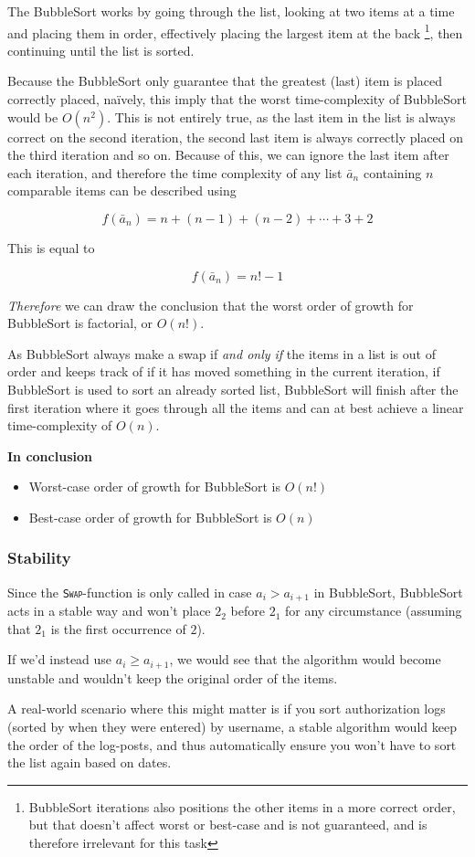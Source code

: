 \documentclass[a4paper,11pt]{article}
\begin{document}
The BubbleSort works by going through the list, looking at two items at a time and placing them in order, effectively placing the largest item at the back \footnote{BubbleSort iterations also positions the other items in a more correct order, but that doesn't affect worst or best-case and is not guaranteed, and is therefore irrelevant for this task}, then continuing until the list is sorted.

Because the BubbleSort only guarantee that the greatest (last) item is placed correctly placed, naïvely, this imply that the worst time-complexity of BubbleSort would be $O(n^2)$. This is not entirely true, as the last item in the list is always correct on the second iteration, the second last item is always correctly placed on the third iteration and so on. Because of this, we can ignore the last item after each iteration, and therefore the time complexity of any list $\bar{a}_n$ containing $n$ comparable items can be described using

$$ f(\bar{a}_n) = n + (n-1) + (n-2) + \cdots + 3 + 2$$

This is equal to

$$ f(\bar{a}_n) = n! - 1$$

\textit{Therefore} we can draw the conclusion that the worst order of growth for BubbleSort is factorial, or $O(n!)$.

As BubbleSort always make a swap if \textit{and only if} the items in a list is out of order and keeps track of if it has moved something in the current iteration, if BubbleSort is used to sort an already sorted list, BubbleSort will finish after the first iteration where it goes through all the items and can at best achieve a linear time-complexity of $O(n)$.

\textbf{In conclusion}

\begin{itemize}
\item Worst-case order of growth for BubbleSort is $O(n!)$
\item Best-case order of growth for BubbleSort is $O(n)$
\end{itemize}

\subsubsection{Stability}
Since the \texttt{\textsc{Swap}}-function is only called in case $a_i > a_{i+1}$ in BubbleSort, BubbleSort acts in a stable way and won't place $2_2$ before $2_1$ for any circumstance (assuming that $2_1$ is the first occurrence of $2$).

If we'd instead use $a_i \geq a_{i+1}$, we would see that the algorithm would become unstable and wouldn't keep the original order of the items.

A real-world scenario where this might matter is if you sort authorization logs (sorted by when they were entered) by username, a stable algorithm would keep the order of the log-posts, and thus automatically ensure you won't have to sort the list again based on dates.
\end{document}

